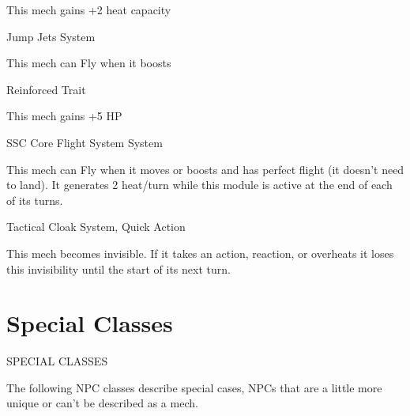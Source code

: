 This mech gains +2 heat capacity


Jump Jets
System

This mech can Fly when it boosts


Reinforced
Trait

This mech gains +5 HP


SSC Core Flight System
System

This mech can Fly when it moves or boosts and has perfect flight (it doesn’t need to land). It
generates 2 heat/turn while this module is active at the end of each of its turns.


Tactical Cloak
System, Quick Action

This mech becomes invisible. If it takes an action, reaction, or overheats it loses this invisibility
until the start of its next turn.

\chapter{Special Classes}
      SPECIAL CLASSES

The following NPC classes describe special cases, NPCs that are a little more unique or can’t be
described as a mech.







































